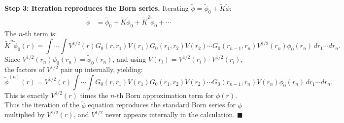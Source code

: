 \documentclass[12pt]{article}
\begin{document}
\textbf{Step 3: Iteration reproduces the Born series.}
Iterating $\tilde\phi = \tilde\phi_0 + \tilde K\tilde\phi$:
\begin{align*}
\tilde\phi &= \tilde\phi_0 + \tilde K\tilde\phi_0 + \tilde K^2\tilde\phi_0 + \cdots
\end{align*}
The $n$-th term is:
\[
\tilde K^n\tilde\phi_0(r) = \int\!\cdots\!\int V^{1/2}(r)G_0(r,r_1)V(r_1)G_0(r_1,r_2)V(r_2)\cdots G_0(r_{n-1},r_n)V^{1/2}(r_n)\phi_0(r_n)\,dr_1\cdots dr_n.
\]
Since $V^{1/2}(r_n)\phi_0(r_n) = \tilde\phi_0(r_n)$, and using $V(r_i) = V^{1/2}(r_i)\cdot V^{1/2}(r_i)$, the factors of $V^{1/2}$ pair up internally, yielding:
\[
\tilde\phi^{(n)}(r) = V^{1/2}(r)\int\!\cdots\!\int G_0(r,r_1)V(r_1)G_0(r_1,r_2)V(r_2)\cdots G_0(r_{n-1},r_n)V(r_n)\phi_0(r_n)\,dr_1\cdots dr_n.
\]
This is exactly $V^{1/2}(r)$ times the $n$-th Born approximation term for $\phi(r)$. Thus the iteration of the $\tilde\phi$ equation reproduces the standard Born series for $\phi$ multiplied by $V^{1/2}(r)$, and $V^{1/2}$ never appears internally in the calculation. $\blacksquare$
\end{document}
